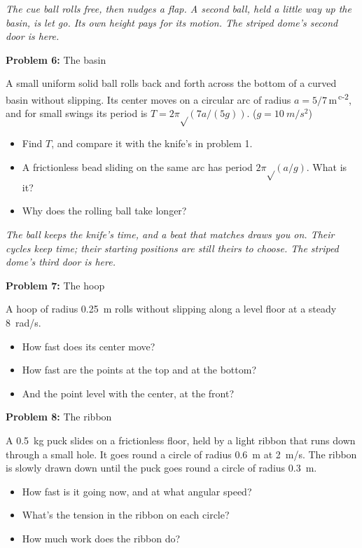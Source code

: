 \documentclass[11pt]{article}
\newcommand{\room}[1]{\par\bigskip{\large\bfseries #1}\par\nopagebreak\smallskip}
\newcommand{\scene}[1]{\par{\itshape #1}\par}
\newcommand{\problem}[2]{\par\medskip\textbf{Problem #1:} #2\par\nopagebreak}
\newenvironment{parts}{\begin{itemize}[leftmargin=3.4em,labelwidth=2.8em,labelsep=0.6em,align=left,itemsep=2pt,topsep=3pt]}{\end{itemize}}
\newcommand{\pt}[1]{\item[\textbf{#1}]}
\newcommand{\sv}[1]{\textsuperscript{\dag\,#1}}
\newcommand{\rt}{\text{√}}  %
\begin{document}
\room{Conservatory}
\scene{The cue ball rolls free, then nudges a flap. A second ball, held a little way up the basin, is let go. Its own height pays for its motion. The striped dome's second door is here.}
\problem{6}{The basin}
A small uniform solid ball rolls back and forth across the bottom of a curved basin without slipping. Its center moves on a circular arc of radius $a = 5/7$\,m\sv{c-2}, and for small swings its period is $T = 2\pi\rt(7a/(5g))$. ($g = \SI{10}{m/s^2}$)
\begin{parts}
\pt{6-a} Find $T$, and compare it with the knife's in problem 1.
\pt{6-b} A frictionless bead sliding on the same arc has period $2\pi\rt(a/g)$. What is it?
\pt{6-c} Why does the rolling ball take longer?
\end{parts}

\room{Ballroom}
\scene{The ball keeps the knife's time, and a beat that matches draws you on. Their cycles keep time; their starting positions are still theirs to choose. The striped dome's third door is here.}
\problem{7}{The hoop}
A hoop of radius \SI{0.25}{m} rolls without slipping along a level floor at a steady \SI{8}{rad/s}.
\begin{parts}
\pt{7-a} How fast does its center move?
\pt{7-b} How fast are the points at the top and at the bottom?
\pt{7-c} And the point level with the center, at the front?
\end{parts}

\problem{8}{The ribbon}
A \SI{0.5}{kg} puck slides on a frictionless floor, held by a light ribbon that runs down through a small hole. It goes round a circle of radius \SI{0.6}{m} at \SI{2}{m/s}. The ribbon is slowly drawn down until the puck goes round a circle of radius \SI{0.3}{m}.
\begin{parts}
\pt{8-a} How fast is it going now, and at what angular speed?
\pt{8-b} What's the tension in the ribbon on each circle?
\pt{8-c} How much work does the ribbon do?
\end{parts}
\end{document}
